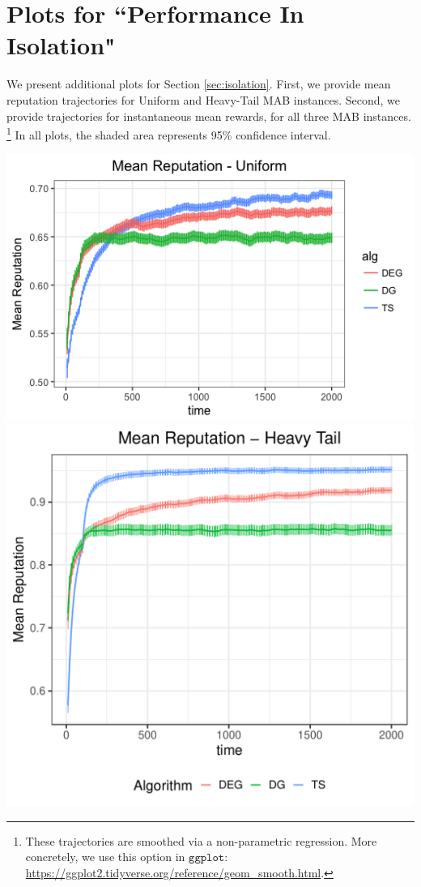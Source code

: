 \documentclass[../competing_bandits_with_appendix.tex]{subfiles}
\begin{document}
\section{Plots for ``Performance In Isolation"}

We present additional plots for Section \ref{sec:isolation}. First, we provide mean reputation trajectories for Uniform and Heavy-Tail MAB instances. Second, we provide trajectories for instantaneous mean rewards, for all three MAB instances.%
\footnote{These trajectories are smoothed via a non-parametric regression.
More concretely, we use this option in $\texttt{ggplot}$:
\url{https://ggplot2.tidyverse.org/reference/geom_smooth.html}.}
In all plots, the shaded area represents 95\% confidence interval.

\begin{center}
\includegraphics[scale=0.35]{ec19paper/appendix_figures/uniform_mean}
\includegraphics[scale=0.35]{ec19paper/appendix_figures/ht_mean}
\end{center}
\end{document}
